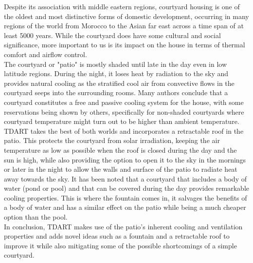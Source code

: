 \documentclass[justified]{tufte-book}
\begin{document}
	
	Despite its association with middle eastern regions, courtyard housing is one of the oldest and most distinctive forms of domestic development, occurring in many regions of the world from Morocco to the Asian far east across a time span of at least 5000 years\cite{edwards2006courtyard}. While the courtyard does have some cultural and social significance, more important to us is its impact on the house in terms of thermal comfort and airflow control.\\
	The courtyard or "patio" is mostly shaded until late in the day even in low latitude regions. During the night, it loses heat by radiation to the sky\cite{batty1991natural} and provides natural cooling as the stratified cool air from convective flows in the courtyard seeps into the surrounding rooms. Many authors\cite{scudo1988climatic,fathy1986natural} conclude that a courtyard constitutes a free and passive cooling system for the house, with some reservations being shown by others\cite{etzion1990thermal}, specifically for non-shaded courtyards where courtyard temperature might turn out to be higher than ambient temperature. TDART takes the best of both worlds and incorporates a retractable roof in the patio. This protects the courtyard from solar irradiation, keeping the air temperature as low as possible when the roof is closed during the day and the sun is high, while also providing the option to open it to the sky in the mornings or later in the night to allow the walls and surface of the patio to radiate heat away towards the sky. It has been noted that a courtyard that includes a body of water (pond or pool) and that can be covered during the day provides remarkable cooling properties\cite{al2001effect}. This is where the fountain comes in, it salvages the benefits of a body of water and has a similar effect on the patio while being a much cheaper option than the pool.\\
	In conclusion, TDART makes use of the patio's inherent cooling and ventilation properties and adds novel ideas such as a fountain and a retractable roof to improve it while also mitigating some of the possible shortcomings of a simple courtyard.
	
\end{document}
